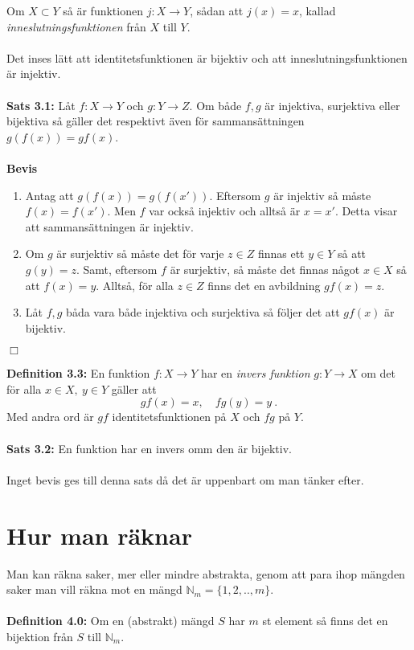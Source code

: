 \documentclass{article}
\begin{document}
Om $X\subset Y$ så är funktionen $j:X\rightarrow Y$, sådan att $j(x)=x$, kallad \textit{inneslutningsfunktionen} från $X$ till $Y$.\\ \\
Det inses lätt att identitetsfunktionen är bijektiv och att inneslutningsfunktionen är injektiv.\\ \\
\textbf{Sats 3.1:} Låt $f:X\rightarrow Y$ och $g:Y\rightarrow Z$. Om både $f,g$ är injektiva, surjektiva eller bijektiva så gäller det respektivt även för sammansättningen $g(f(x))=gf(x)$.\\ \\
\textbf{Bevis}\\
\begin{enumerate}%
    \item Antag att $g(f(x))=g(f(x'))$. Eftersom $g$ är injektiv så måste $f(x)=f(x')$. Men $f$ var också injektiv och alltså är $x=x'$. Detta visar att sammansättningen är injektiv.
    \item Om $g$ är surjektiv så måste det för varje $z\in Z$ finnas ett $y\in Y$ så att $g(y)=z$. Samt, eftersom $f$ är surjektiv, så måste det finnas något $x\in X$ så att $f(x)=y$. Alltså, för alla $z\in Z$ finns det en avbildning $gf(x)=z$.
    \item Låt $f,g$ båda vara både injektiva och surjektiva så följer det att $gf(x)$ är bijektiv.
\end{enumerate}
\begin{flushright}
$\Box$
\end{flushright}
\vspace{0.5 cm}
\noindent
\textbf{Definition 3.3:} En funktion $f:X\rightarrow Y$ har en \textit{invers funktion} $g:Y\rightarrow X$ om det för alla $x\in X, \ y\in Y$ gäller att
$$
gf(x)=x, \quad fg(y)=y \ .
$$
Med andra ord är $gf$ identitetsfunktionen på $X$ och $fg$ på $Y$.\\ \\
\textbf{Sats 3.2:} En funktion har en invers omm den är bijektiv.
\\ \\
Inget bevis ges till denna sats då det är uppenbart om man tänker efter.

\section{Hur man räknar}
Man kan räkna saker, mer eller mindre abstrakta, genom att para ihop mängden saker man vill räkna mot en mängd $\mathbb{N}_m=\{1,2,..,m\}$.\\ \\
\textbf{Definition 4.0:} Om en (abstrakt) mängd $S$ har $m$ st element så finns det en bijektion från $S$ till $\mathbb{N}_m$.
\end{document}
